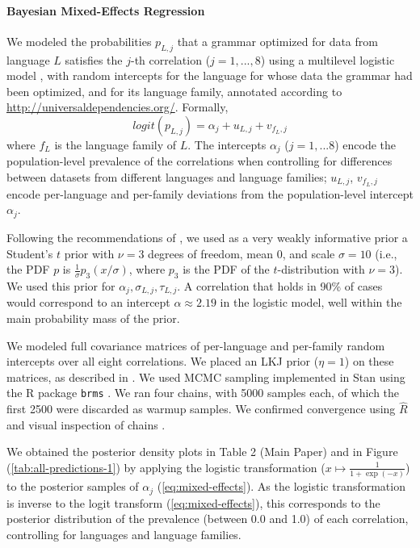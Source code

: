 \documentclass[10pt,twoside,lineno]{article}
\begin{document}
\paragraph{Bayesian Mixed-Effects Regression}
We modeled the probabilities $p_{L,j}$ that a grammar optimized for data from language $L$ satisfies the $j$-th correlation ($j=1,...,8$) using a multilevel logistic model \cite{gelman2013bayesian}, with random intercepts for the language for whose data the grammar had been optimized, and for its language family, annotated according to \url{http://universaldependencies.org/}.
Formally,
\begin{equation}\label{eq:mixed-effects}
logit(p_{L,j}) = \alpha_j + u_{L,j} + v_{f_L,j}
\end{equation}
where $f_L$ is the language family of $L$.
The intercepts $\alpha_j$ ($j=1,...8$) encode the population-level prevalence of the correlations when controlling for differences between datasets from different languages and language families; $u_{L,j}$, $v_{f_L,j}$ encode per-language and per-family deviations from the population-level intercept $\alpha_j$.



Following the recommendations of \cite{ghosh2018use, burkner2018advanced}, we used as a very weakly informative prior a Student's $t$ prior with $\nu=3$ degrees of freedom, mean 0, and scale $\sigma=10$ (i.e., the PDF $p$ is $\frac{1}{\sigma} p_3(x/\sigma)$, where $p_3$ is the PDF of the $t$-distribution with $\nu=3$).
We used this prior for $\alpha_j, \sigma_{L,j}, \tau_{L,j}$.
A correlation that holds in 90\% of cases would correspond to an intercept $\alpha \approx 2.19$ in the logistic model, well within the main probability mass of the prior.

We modeled full covariance matrices of per-language and per-family random intercepts over all eight correlations. We placed an LKJ prior ($\eta=1$) on these matrices, as described in \cite{burkner2018advanced}.
We used MCMC sampling implemented in Stan \cite{carpenter2017stan, hoffman2014no} using the R package \texttt{brms} \cite{buerkner2017brms}.
We ran four chains, with 5000 samples each, of which the first 2500 were discarded as warmup samples.
We confirmed convergence using $\hat{R}$ and visual inspection of chains \cite{gelman2013bayesian}.

We obtained the posterior density plots in Table 2 (Main Paper) and in Figure (\ref{tab:all-predictions-1}) by applying the logistic transformation ($x \mapsto \frac{1}{1+\exp(-x)}$) to the posterior samples of $\alpha_j$ (\ref{eq:mixed-effects}).
As the logistic transformation is inverse to the logit transform (\ref{eq:mixed-effects}), this corresponds to the posterior distribution of the prevalence (between 0.0 and 1.0) of each correlation, controlling for languages and language families.
\end{document}
